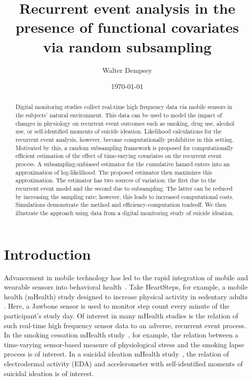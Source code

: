 \documentclass[11pt]{amsart}
\begin{document}
\title{Recurrent event analysis in the presence of functional
  covariates via random subsampling}
\author{Walter Dempsey}
\address {Department of Statistics, 
  Harvard University, One Oxford Street
   Cambridge, MA  02138, USA}

\date{\today}

\begin{abstract}
Digital monitoring studies collect real-time high frequency data via
mobile sensors in the subjects' natural environment.  
This data can be used to model the impact of changes in physiology on
recurrent event outcomes such as smoking, drug use, alcohol use, or
self-identified moments of suicide ideation. 
Likelihood calculations for the recurrent event analysis, however,
become computationally prohibitive in this setting.  
Motivated by this, a random subsampling framework is proposed for
computationally efficient estimation of the effect of time-varying
covariates on the recurrent event process. A subsampling-unbiased
estimator for the cumulative hazard enters into an approximation of
log-likelihood. The proposed estimator then maximizes this
approximation. The estimator has two sources of variation: the first
due to the recurrent event model and the second due to subsampling.
The latter can be reduced by increasing the sampling rate; however,
this leads to increased computational costs. 
Simulations demonstrate the method and efficiency-computation
tradeoff. We then illustrate the approach using data from a digital
monitoring study of suicide ideation.
\end{abstract}



\maketitle

\section{Introduction}

Advancement in mobile technology has led to the rapid integration of
mobile and wearable sensors into behavioral health~\citep{Freeetal2013}.
Take HeartSteps, for example, a mobile health (mHealth) study designed
to increase physical activity in sedentary adults
\citep{KlasnjaHS2019}. Here, a Jawbone sensor is used to monitor step
count every minute of the participant's study day.
Of interest in many mHealth studies is the relation of such
real-time high frequency sensor data to an adverse, recurrent event
process. In the smoking cessation mHealth study~\citep{}, for
example, the relation between a time-varying sensor-based measure of
physiological stress and the smoking lapse process is of interest.
In a suicidal ideation mHealth study~\citep{}, the relation of
electrodermal activity (EDA) and accelerometer with self-identified
moments of suicidal ideation is of interest.
\end{document}
